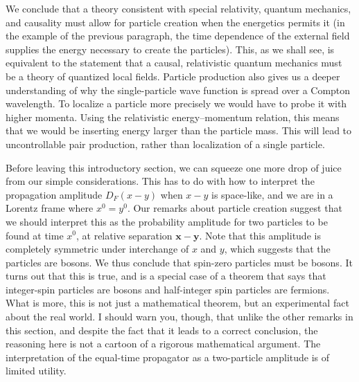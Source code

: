 We conclude that a theory consistent with special relativity, quantum mechanics, and
causality must allow for particle creation when the energetics permits it (in the example
of the previous paragraph, the time dependence of the external field supplies the energy
necessary to create the particles). This, as we shall see, is equivalent to the statement
that a causal, relativistic quantum mechanics must be a theory of quantized local fields.
Particle production also gives us a deeper understanding of why the single-particle wave
function is spread over a Compton wavelength. To localize a particle more precisely we
would have to probe it with higher momenta. Using the relativistic energy--momentum
relation, this means that we would be inserting energy larger than the particle mass.
This will lead to uncontrollable pair production, rather than localization of a single
particle.

Before leaving this introductory section, we can squeeze one more drop of juice
from our simple considerations. This has to do with how to interpret the propagation
amplitude $D_F(x-y)$ when $x-y$ is space-like, and we are in a Lorentz frame where
$x^0=y^0$. Our remarks about particle creation suggest that we should interpret this as
the probability amplitude for two particles to be found at time $x^0$, at relative separation
$\mathbf x-\mathbf y$. Note that this amplitude is completely symmetric under interchange of $x$ and $y$,
which suggests that the particles are bosons. We thus conclude that spin-zero particles
must be bosons. It turns out that this is true, and is a special case of a theorem that
says that integer-spin particles are bosons and half-integer spin particles are fermions.
What is more, this is not just a mathematical theorem, but an experimental fact about
the real world. I should warn you, though, that unlike the other remarks in this section,
and despite the fact that it leads to a correct conclusion, the reasoning here is not a
cartoon of a rigorous mathematical argument. The interpretation of the equal-time
propagator as a two-particle amplitude is of limited utility.
